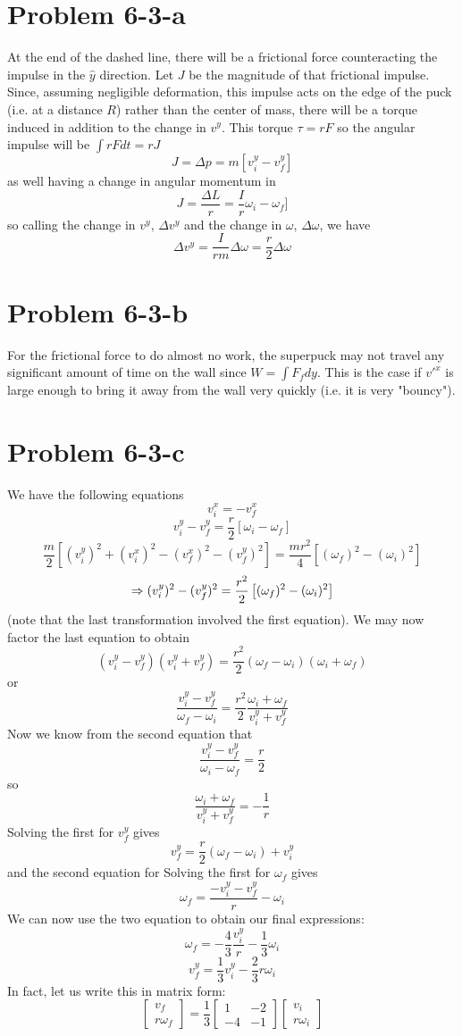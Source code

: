 \section*{Problem 6-3-a}
At the end of the dashed line, there will be a frictional force counteracting the impulse in the $\hat{y}$ direction. Let $J$ be the magnitude of that frictional impulse. Since, assuming negligible deformation, this impulse acts on the edge of the puck (i.e. at a distance $R$) rather than the center of mass, there will be a torque induced in addition to the change in $v^y$.  This torque $\tau = r F$ so the angular impulse will be $\int r F dt = r J$
\[ J = \Delta p = m[v_i^y - v_f^y] \]
as well having a change in angular momentum in 
\[ J = \frac{\Delta L}{r} = \frac{I}{r}\omega_i - \omega_f] \]
so calling the change in $v^y$, $\Delta v^y$ and the change in $\omega$, $\Delta \omega$, we have
\[ \Delta v^y = \frac{I}{r m} \Delta \omega = \frac{r}{2} \Delta \omega \]
\section*{Problem 6-3-b}
For the frictional force to do almost no work, the superpuck may not travel any significant amount of time on the wall since $W= \int F_f dy$. This is the case if $v'^x$ is large enough to bring it away from the wall very quickly (i.e. it is very "bouncy"). 
\section*{Problem 6-3-c}
We have the following equations
\[v_i^x = - v_f^x \]
\[v_i^y - v_f^y = \frac{r}{2} [\omega_i - \omega_f] \]
\[ \frac{m}{2}[ (v_i^y)^2 + (v_i^x)^2 - (v_f^x)^2 -  (v_f^y)^2 ] = \frac{mr^2}{4} \left[  (\omega_f)^2 - (\omega_i)^2 \right] \]
\[ \Rightarrow (v_i^y)^2 - (v_f^y)^2 = \frac{r^2}{2}\left[ (\omega_f)^2 - (\omega_i)^2 \right] \]
 (note that the last transformation involved the first equation).
We may now factor the last equation to obtain
\[ (v_i^y - v_f^y) (v_i^y + v_f^y) = \frac{r^2}{2} (\omega_f - \omega_i) (\omega_i + \omega_f) \]
or 
\[  \frac{v_i^y - v_f^y}{\omega_f - \omega_i} = \frac{r^2}{2} \frac{\omega_i + \omega_f}{v_i^y + v_f^y} \] 
Now we know from the second equation that
\[ \frac{v_i^y - v_f^y}{\omega_i - \omega_f} = \frac{r}{2} \]
so 
\[ \frac{\omega_i + \omega_f}{v_i^y + v_f^y} = -\frac{1}{r} \]
Solving the first for $v_f^y$ gives
\[ v_f^y = \frac{r}{2} (\omega_f-\omega_i) + v_i^y \]
and the second equation for
Solving the first for $\omega_f$ gives
\[ \omega_f = \frac{-v_i^y-v_f^y}{r} - \omega_i \]
We can now use the two equation to obtain our final expressions: 
\[ \omega_f = -\frac{4}{3}\frac{v_i^y}{r} - \frac{1}{3}\omega_i \]
\[ v_f^y = \frac{1}{3}v_i^y -  \frac{2}{3} r \omega_i \]
In fact, let us write this in matrix form:
\[ \begin{bmatrix} v_f \\ r \omega_f \end{bmatrix} = \frac{1}{3}\begin{bmatrix}
1 & -2 
\\ -4 & -1
\end{bmatrix} \begin{bmatrix} v_i \\ r \omega_i \end{bmatrix} \]
